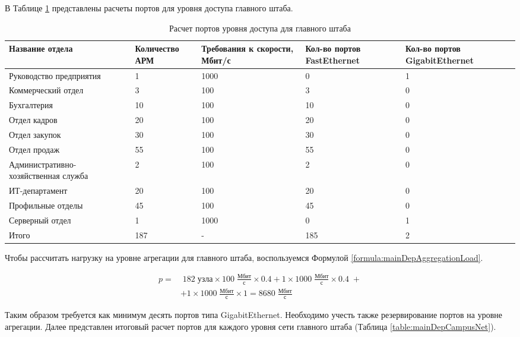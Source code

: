 \documentclass[14pt, a4paper]{extarticle}
\numberwithin{equation}{section}
\begin{document}
В Таблице \ref{table:mainDepAccessLevel} представлены расчеты портов для уровня доступа 
главного штаба.

\begin{table}[H]
\centering
\small
\caption{Расчет портов уровня доступа для главного штаба}
\begin{tabular}{|m{4cm}|m{2.5cm}|m{2.5cm}|m{2.5cm}|m{3cm}|}
\hline
\textbf{Название отдела} & \textbf{Количество АРМ} & \textbf{Требования к скорости, Мбит/с} & \textbf{Кол-во портов FastEthernet} & \textbf{Кол-во портов GigabitEthernet} \\
\hline
Руководство предприятия & 1 & 1000 & 0 & 1 \\
\hline
Коммерческий отдел & 3 & 100 & 3 & 0 \\
\hline
Бухгалтерия & 10 & 100 & 10 & 0 \\
\hline
Отдел кадров & 20 & 100 & 20 & 0 \\
\hline
Отдел закупок & 30 & 100 & 30 & 0 \\
\hline
Отдел продаж & 55 & 100 & 55 & 0 \\
\hline
Административно-хозяйственная служба & 2 & 100 & 2 & 0 \\
\hline
ИТ-департамент & 20 & 100 & 20 & 0 \\
\hline
Профильные отделы & 45 & 100 & 45 & 0 \\
\hline
Серверный отдел & 1 & 1000 & 0 & 1 \\
\hline
Итого & 187 & - & 185 & 2 \\
\hline 
\end{tabular}
\label{table:mainDepAccessLevel}
\end{table}

Чтобы рассчитать нагрузку на уровне агрегации для 
главного штаба, воспользуемся Формулой \ref{formula:mainDepAggregationLoad}.

\begin{equation}
\begin{aligned}
p = & \; 182 \; \text{узла} \times 100 \;\frac{\text{Мбит}}{\text{с}} \times 0.4 + 1 \times 1000 \;\frac{\text{Мбит}}{\text{с}} \times 0.4\; + \\
        & + 1 \times 1000\;\frac{\text{Мбит}}{\text{с}} \times 1 = 8680\;\frac{\text{Мбит}}{\text{с}}
\end{aligned}
\label{formula:mainDepAggregationLoad}
\end{equation}
               
Таким образом требуется как минимум десять портов типа GigabitEthernet.
Необходимо учесть также резервирование портов на уровне агрегации.
Далее представлен итоговый расчет портов для каждого уровня сети
главного штаба (Таблица \ref{table:mainDepCampusNet}). 
\end{document}
